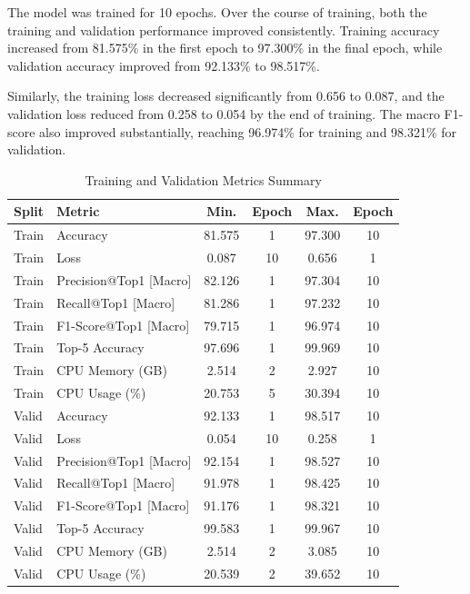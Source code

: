 \documentclass{ieeeaccess}
\begin{document}
The model was trained for 10 epochs. Over the course of training, both the training and validation performance improved consistently. Training accuracy increased from 81.575\% in the first epoch to 97.300\% in the final epoch, while validation accuracy improved from 92.133\% to 98.517\%.

Similarly, the training loss decreased significantly from 0.656 to 0.087, and the validation loss reduced from 0.258 to 0.054 by the end of training. The macro F1-score also improved substantially, reaching 96.974\% for training and 98.321\% for validation.

\begin{table}[t!]
\centering
\caption{Training and Validation Metrics Summary}
\begin{tabular}{|l|l|c|c|c|c|}
\hline
\textbf{Split} & \textbf{Metric} & \textbf{Min.} & \textbf{Epoch} & \textbf{Max.} & \textbf{Epoch} \\
\hline
Train & Accuracy & 81.575 & 1 & 97.300 & 10 \\
Train & Loss & 0.087 & 10 & 0.656 & 1 \\
Train & Precision@Top1 [Macro] & 82.126 & 1 & 97.304 & 10 \\
Train & Recall@Top1 [Macro] & 81.286 & 1 & 97.232 & 10 \\
Train & F1-Score@Top1 [Macro] & 79.715 & 1 & 96.974 & 10 \\
Train & Top-5 Accuracy & 97.696 & 1 & 99.969 & 10 \\
Train & CPU Memory (GB) & 2.514 & 2 & 2.927 & 10 \\
Train & CPU Usage (\%) & 20.753 & 5 & 30.394 & 10 \\
\hline
Valid & Accuracy & 92.133 & 1 & 98.517 & 10 \\
Valid & Loss & 0.054 & 10 & 0.258 & 1 \\
Valid & Precision@Top1 [Macro] & 92.154 & 1 & 98.527 & 10 \\
Valid & Recall@Top1 [Macro] & 91.978 & 1 & 98.425 & 10 \\
Valid & F1-Score@Top1 [Macro] & 91.176 & 1 & 98.321 & 10 \\
Valid & Top-5 Accuracy & 99.583 & 1 & 99.967 & 10 \\
Valid & CPU Memory (GB) & 2.514 & 2 & 3.085 & 10 \\
Valid & CPU Usage (\%) & 20.539 & 2 & 39.652 & 10 \\
\hline
\end{tabular}
\label{tab:cnn_metrics_summary}
\end{table}
\end{document}
